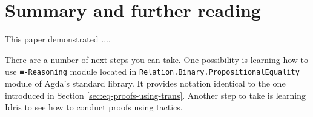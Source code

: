 \section{Summary and further reading}

This paper demonstrated ....


There are a number of next steps you can take. One possibility is learning how to use \texttt{≡-Reasoning} module located in \texttt{Relation.}\texttt{Binary.}\texttt{PropositionalEquality} module of Agda's standard library. It provides notation identical to the one introduced in Section \ref{sec:eq-proofs-using-trans}. Another step to take is learning Idris \cite{Bra13} to see how to conduct proofs using tactics.